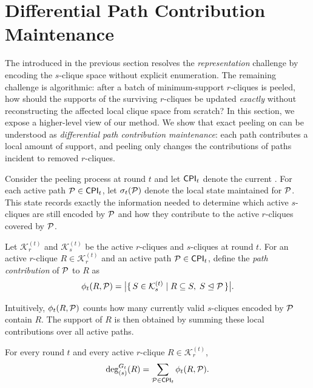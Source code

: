 \section{Differential Path Contribution Maintenance}
\label{sec:dpcm}

The \cpi introduced in the previous section resolves the \emph{representation} challenge by encoding the $s$-clique space without explicit enumeration.
%
The remaining challenge is algorithmic: after a batch of minimum-support $r$-cliques is peeled, how should the supports of the surviving $r$-cliques be updated \emph{exactly} without reconstructing the affected local clique space from scratch?
%
In this section, we expose a higher-level view of our method.
%
We show that exact peeling on \cpi can be understood as \emph{differential path contribution maintenance}: each path contributes a local amount of support, and peeling only changes the contributions of paths incident to removed $r$-cliques.

\begin{definition}\label{def:path-state}
Consider the peeling process at round $t$ and let ${\mathsf{CPI}}_t$ denote the current \cpi.
For each active path $\TPath \in \cpi_t$, let $\sigma_t(\TPath)$ denote the local state maintained for $\TPath$.
%
This state records exactly the information needed to determine which active $s$-cliques are still encoded by $\TPath$ and how they contribute to the active $r$-cliques covered by $\TPath$.
\end{definition}

\begin{definition}\label{def:path-contribution}
Let $\mathcal{K}_r^{(t)}$ and $\mathcal{K}_s^{(t)}$ be the active $r$-cliques and $s$-cliques at round $t$.
For an active $r$-clique $R \in \mathcal{K}_r^{(t)}$ and an active path $\TPath \in \cpi_t$, define the \emph{path contribution} of $\TPath$ to $R$ as
\[
\phi_t(R,\TPath)
=
\bigl|\{\,S \in \mathcal{K}_s^{(t)} \mid R \subseteq S,\; S \encodedby \TPath \,\}\bigr|.
\]
\end{definition}

Intuitively, $\phi_t(R,\TPath)$ counts how many currently valid $s$-cliques encoded by $\TPath$ contain $R$.
%
The support of $R$ is then obtained by summing these local contributions over all active paths.

\begin{theorem}\label{thm:dpcm-support}
For every round $t$ and every active $r$-clique $R \in \mathcal{K}_r^{(t)}$,
\[
\deg^{G_t}_{(s)}(R)
=
\sum_{\TPath \in \cpi_t}\phi_t(R,\TPath).
\]
\end{theorem}

